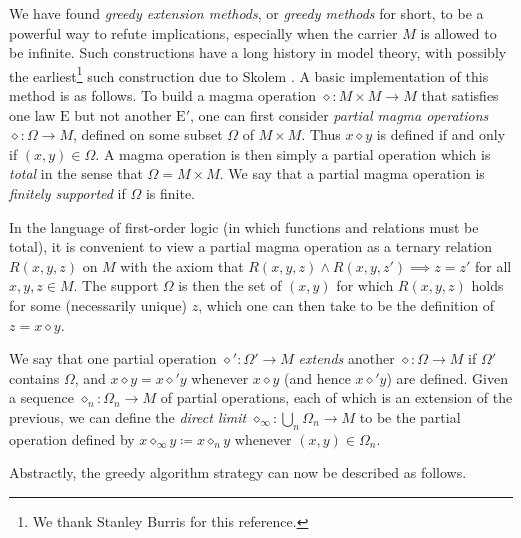 \documentclass[12pt]{amsart}
\theoremstyle{definition}
\newcommand{\op}{\diamond}
\newcommand{\E}{\mathrm{E}}
\begin{document}
We have found \emph{greedy extension methods}, or \emph{greedy methods} for short, to be a powerful way to refute implications, especially when the carrier $M$ is allowed to be infinite.  Such constructions have a long history in model theory, with possibly the earliest\footnote{We thank Stanley Burris for this reference.} such construction due to Skolem \cite{skolem}. A basic implementation of this method is as follows.  To build a magma operation $\op \colon M \times M \to M$ that satisfies one law $\E$ but not another ${\E'}$, one can first consider \emph{partial magma operations} $\op \colon \Omega \to M$, defined on some subset $\Omega$ of $M \times M$. Thus $x \op y$ is defined if and only if $(x,y) \in \Omega$. A magma operation is then simply a partial operation which is \emph{total} in the sense that $\Omega = M \times M$.  We say that a partial magma operation is \emph{finitely supported} if $\Omega$ is finite.

In the language of first-order logic (in which functions and relations must be total), it is convenient to view a partial magma operation as a ternary relation $R(x,y,z)$ on $M$ with the axiom that $R(x,y,z) \wedge R(x,y,z') \implies z=z'$ for all $x,y,z \in M$.  The support $\Omega$ is then the set of $(x,y)$ for which $R(x,y,z)$ holds for some (necessarily unique) $z$, which one can then take to be the definition of $z = x \op y$.

We say that one partial operation $\op' \colon \Omega' \to M$ \emph{extends} another $\op \colon \Omega \to M$ if $\Omega'$ contains $\Omega$, and $x \op y = x \op' y$ whenever $x \op y$ (and hence $x \op' y$) are defined. Given a sequence $\op_n \colon \Omega_n \to M$ of partial operations, each of which is an extension of the previous, we can define the \emph{direct limit} $\op_\infty \colon \bigcup_n \Omega_n \to M$ to be the partial operation defined by $x \op_\infty y \coloneqq x \op_n y$ whenever $(x,y) \in \Omega_n$.

Abstractly, the greedy algorithm strategy can now be described as follows.
\end{document}
